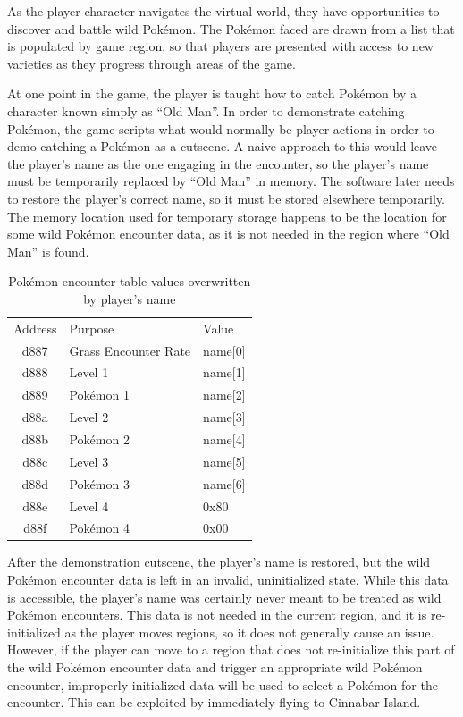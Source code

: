 \documentclass[letterpaper]{article}
\begin{document}
As the player character navigates the virtual world, they have opportunities to discover and battle wild Pokémon. The Pokémon faced are drawn from a list that is populated by game region, so that players are presented with access to new varieties as they progress through areas of the game.

At one point in the game, the player is taught how to catch Pokémon by a character known simply as ``Old Man''. In order to demonstrate catching Pokémon, the game scripts what would normally be player actions in order to demo catching a Pokémon as a cutscene. A naive approach to this would leave the player's name as the one engaging in the encounter, so the player's name must be temporarily replaced by ``Old Man'' in memory. The software later needs to restore the player's correct name, so it must be stored elsewhere temporarily. The memory location used for temporary storage happens to be the location for some wild Pokémon encounter data, as it is not needed in the region where ``Old Man'' is found.

\begin{table}[h!]
\centering
\begin{tabular}{cll}
Address &              Purpose &   Value \\
   d887 & Grass Encounter Rate & name[0] \\
   d888 &              Level 1 & name[1] \\
   d889 &            Pokémon 1 & name[2] \\
   d88a &              Level 2 & name[3] \\
   d88b &            Pokémon 2 & name[4] \\
   d88c &              Level 3 & name[5] \\
   d88d &            Pokémon 3 & name[6] \\
   d88e &              Level 4 &    0x80 \\
   d88f &            Pokémon 4 &    0x00 \\
\end{tabular}
\caption{Pokémon encounter table values overwritten by player's name}
\end{table}

After the demonstration cutscene, the player's name is restored, but the wild Pokémon encounter data is left in an invalid, uninitialized state. While this data is accessible, the player's name was certainly never meant to be treated as wild Pokémon encounters. This data is not needed in the current region, and it is re-initialized as the player moves regions, so it does not generally cause an issue. However, if the player can move to a region that does not re-initialize this part of the wild Pokémon encounter data and trigger an appropriate wild Pokémon encounter, improperly initialized data will be used to select a Pokémon for the encounter. This can be exploited by immediately flying to Cinnabar Island.
\end{document}
